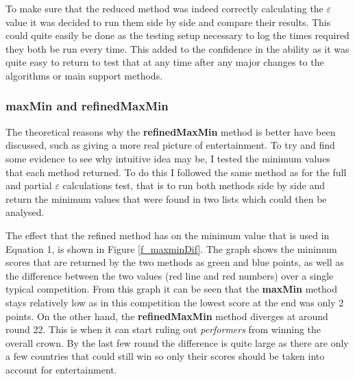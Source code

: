 \documentclass[12pt]{report}
\begin{document}
To make sure that the reduced method was indeed correctly calculating the $\varepsilon$ value it was decided to run them side by side and compare their results. This could quite easily be done as the testing setup necessary to log the times required they both be run every time. This added to the confidence in the ability as it was quite easy to return to test that at any time after any major changes to the algorithms or main support methods.

\subsubsection{maxMin and refinedMaxMin}
The theoretical reasons why the \textbf{refinedMaxMin} method is better have been discussed, such as giving a more real picture of entertainment. To try and find some evidence to see why intuitive idea may be, I tested the minimum values that each method returned. To do this I followed the same method as for the full and partial $\varepsilon$ calculations test, that is to run both methods side by side and return the minimum values that were found in two lists which could then be analysed.

The effect that the refined method has on the minimum value that is used in Equation 1, is shown in Figure \ref{f_maxminDif}. The graph shows the minimum scores that are returned by the two methods as green and blue points, as well as the difference between the two values (red line and red numbers) over a single typical competition. From this graph it can be seen that the \textbf{maxMin} method stays relatively low as in this competition the lowest score at the end was only 2 points. On the other hand, the \textbf{refinedMaxMin} method diverges at around round 22. This is when it can start ruling out \textit{performers} from winning the overall crown. By the last few round the difference is quite large as there are only a few countries that could still win so only their scores should be taken into account for entertainment.
\end{document}
